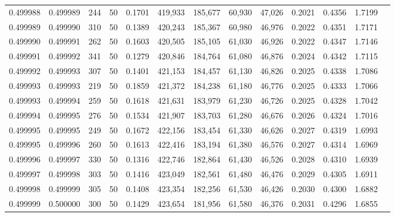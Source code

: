 \begin{tabular}{rrrrrrrrrrrrr}
0.499988 & 0.499989 & 244 &  50 &                                     0.1701 & 419,933 & 185,677 &  60,930 &  47,026 & 0.2021 & 0.4356 & 1.7199 \\
0.499989 & 0.499990 & 310 &  50 &                                     0.1389 & 420,243 & 185,367 &  60,980 &  46,976 & 0.2022 & 0.4351 & 1.7171 \\
0.499990 & 0.499991 & 262 &  50 &                                     0.1603 & 420,505 & 185,105 &  61,030 &  46,926 & 0.2022 & 0.4347 & 1.7146 \\
0.499991 & 0.499992 & 341 &  50 &                                     0.1279 & 420,846 & 184,764 &  61,080 &  46,876 & 0.2024 & 0.4342 & 1.7115 \\
0.499992 & 0.499993 & 307 &  50 &                                     0.1401 & 421,153 & 184,457 &  61,130 &  46,826 & 0.2025 & 0.4338 & 1.7086 \\
0.499993 & 0.499993 & 219 &  50 &                                     0.1859 & 421,372 & 184,238 &  61,180 &  46,776 & 0.2025 & 0.4333 & 1.7066 \\
0.499993 & 0.499994 & 259 &  50 &                                     0.1618 & 421,631 & 183,979 &  61,230 &  46,726 & 0.2025 & 0.4328 & 1.7042 \\
0.499994 & 0.499995 & 276 &  50 &                                     0.1534 & 421,907 & 183,703 &  61,280 &  46,676 & 0.2026 & 0.4324 & 1.7016 \\
0.499995 & 0.499995 & 249 &  50 &                                     0.1672 & 422,156 & 183,454 &  61,330 &  46,626 & 0.2027 & 0.4319 & 1.6993 \\
0.499995 & 0.499996 & 260 &  50 &                                     0.1613 & 422,416 & 183,194 &  61,380 &  46,576 & 0.2027 & 0.4314 & 1.6969 \\
0.499996 & 0.499997 & 330 &  50 &                                     0.1316 & 422,746 & 182,864 &  61,430 &  46,526 & 0.2028 & 0.4310 & 1.6939 \\
0.499997 & 0.499998 & 303 &  50 &                                     0.1416 & 423,049 & 182,561 &  61,480 &  46,476 & 0.2029 & 0.4305 & 1.6911 \\
0.499998 & 0.499999 & 305 &  50 &                                     0.1408 & 423,354 & 182,256 &  61,530 &  46,426 & 0.2030 & 0.4300 & 1.6882 \\
0.499999 & 0.500000 & 300 &  50 &                                     0.1429 & 423,654 & 181,956 &  61,580 &  46,376 & 0.2031 & 0.4296 & 1.6855 \\

\end{tabular}
